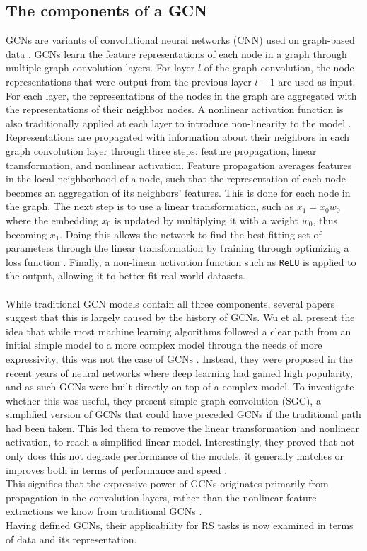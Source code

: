 \subsection{The components of a GCN}
GCNs are variants of convolutional neural networks (CNN) used on graph-based data \cite{KOrderConnectivity}.
GCNs learn the feature representations of each node in a graph through multiple graph convolution layers.
For layer $l$ of the graph convolution, the node representations that were output from the previous layer $l-1$ are used as input.
For each layer, the representations of the nodes in the graph are aggregated with the representations of their neighbor nodes.
A nonlinear activation function is also traditionally applied at each layer to introduce non-linearity to the model \cite{KOrderConnectivity}.
Representations are propagated with information about their neighbors in each graph convolution layer through three steps: feature propagation, linear transformation, and nonlinear activation.
Feature propagation averages features in the local neighborhood of a node, such that the representation of each node becomes an aggregation of its neighbors' features.
This is done for each node in the graph.
The next step is to use a linear transformation, such as $x_1 = x_0w_0$ where the embedding $x_0$ is updated by multiplying it with a weight $w_0$, thus becoming $x_1$.
Doing this allows the network to find the best fitting set of parameters through the linear transformation by training through optimizing a loss function \cite{RecentConvNets}.
Finally, a non-linear activation function such as \texttt{ReLU} is applied to the output, allowing it to better fit real-world datasets.
\\\\
While traditional GCN models contain all three components, several papers \cite{SimplifyingGCN,LightGCN,HeteGCN} suggest that this is largely caused by the history of GCNs.
Wu et al. present the idea that while most machine learning algorithms followed a clear path from an initial simple model to a more complex model through the needs of more expressivity, this was not the case of GCNs \cite{SimplifyingGCN}.
Instead, they were proposed in the recent years of neural networks where deep learning had gained high popularity, and as such GCNs were built directly on top of a complex model.
To investigate whether this was useful, they present simple graph convolution (SGC), a simplified version of GCNs that could have preceded GCNs if the traditional path had been taken.
This led them to remove the linear transformation and nonlinear activation, to reach a simplified linear model.
Interestingly, they proved that not only does this not degrade performance of the models, it generally matches or improves both in terms of performance and speed \cite{SimplifyingGCN}.\\
This signifies that the expressive power of GCNs originates primarily from propagation in the convolution layers, rather than the nonlinear feature extractions we know from traditional GCNs \cite{SimplifyingGCN}.
\\
Having defined GCNs, their applicability for RS tasks is now examined in terms of data and its representation.

